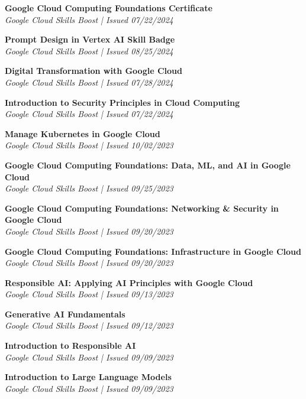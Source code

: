 \documentclass[letterpaper,11pt]{article}
\begin{document}
\begin{itemize}[leftmargin=0.15in, label={}]
{{    %
    \item{
        \textbf{Google Cloud Computing Foundations Certificate} \\
        \textit{Google Cloud Skills Boost | Issued 07/22/2024} \\
    }
    \item{
        \textbf{Prompt Design in Vertex AI Skill Badge} \\
        \textit{Google Cloud Skills Boost | Issued 08/25/2024} \\
    }
    \item{
        \textbf{Digital Transformation with Google Cloud} \\
        \textit{Google Cloud Skills Boost | Issued 07/28/2024} \\
    }
    \item{
        \textbf{Introduction to Security Principles in Cloud Computing} \\
        \textit{Google Cloud Skills Boost | Issued 07/22/2024} \\
    }
    \item{
        \textbf{Manage Kubernetes in Google Cloud} \\
        \textit{Google Cloud Skills Boost | Issued 10/02/2023} \\
    }
    \item{
        \textbf{Google Cloud Computing Foundations: Data, ML, and AI in Google Cloud} \\
        \textit{Google Cloud Skills Boost | Issued 09/25/2023} \\
    }
    \item{
        \textbf{Google Cloud Computing Foundations: Networking \& Security in Google Cloud} \\
        \textit{Google Cloud Skills Boost | Issued 09/20/2023} \\
    }
    \item{
        \textbf{Google Cloud Computing Foundations: Infrastructure in Google Cloud} \\
        \textit{Google Cloud Skills Boost | Issued 09/20/2023} \\
    }
    \item{
        \textbf{Responsible AI: Applying AI Principles with Google Cloud} \\
        \textit{Google Cloud Skills Boost | Issued 09/13/2023} \\
    }
    \item{
        \textbf{Generative AI Fundamentals} \\
        \textit{Google Cloud Skills Boost | Issued 09/12/2023} \\
    }
    \item{
        \textbf{Introduction to Responsible AI} \\
        \textit{Google Cloud Skills Boost | Issued 09/09/2023} \\
    }
    \item{
        \textbf{Introduction to Large Language Models} \\
        \textit{Google Cloud Skills Boost | Issued 09/09/2023} \\
    }

}}
\end{itemize}
\end{document}
